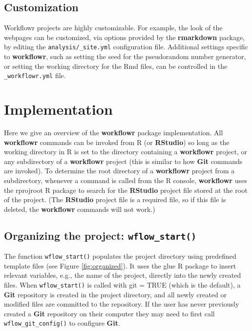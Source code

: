 \documentclass[9pt,a4paper]{extarticle}
\begin{document}
\subsection*{Customization}

Workflowr projects are highly customizable. For example, the look of the
webpages can be customized, via options provided by the \textbf{rmarkdown}
package, by editing the \verb|analysis/_site.yml| configuration file.
Additional settings specific to \textbf{workflowr}, such as setting the seed for
the pseudorandom number generator, or setting the working directory for
the Rmd files, can be controlled in the \verb|_workflowr.yml| file.


\section*{Implementation}

Here we give an overview of the \textbf{workflowr} package implementation. All \textbf{workflowr} commands can be invoked from R (or \textbf{RStudio}) so long as the working directory in R is set to the directory containing a \textbf{workflowr} project, or any subdirectory of a \textbf{workflowr} project (this is similar to how \textbf{Git} commands are invoked). To determine the root directory of a \textbf{workflowr} project from a subdirectory, whenever a command is called from the R console, \textbf{workflowr} uses the rprojroot R package to search for the \textbf{RStudio} project file stored at the root of the project. (The \textbf{RStudio} project file is a required file, so if this file is deleted, the \textbf{workflowr} commands will not work.)

\subsection*{Organizing the project: \texttt{wflow\_start()}}

The function \texttt{wflow\_start()} populates the project directory using
predefined template files (see Figure \ref{fig:organized}). It uses the glue R package to
insert relevant variables, e.g., the name of the project, directly into
the newly created files. When \texttt{wflow\_start()} is called with git = TRUE
(which is the default), a \textbf{Git} repository is created in the project
directory, and all newly created or modified files are committed to the
repository. If the user has never previously created a \textbf{Git} repository on
their computer they may need to first call \texttt{wflow\_git\_config()} to
configure \textbf{Git}.
\end{document}
